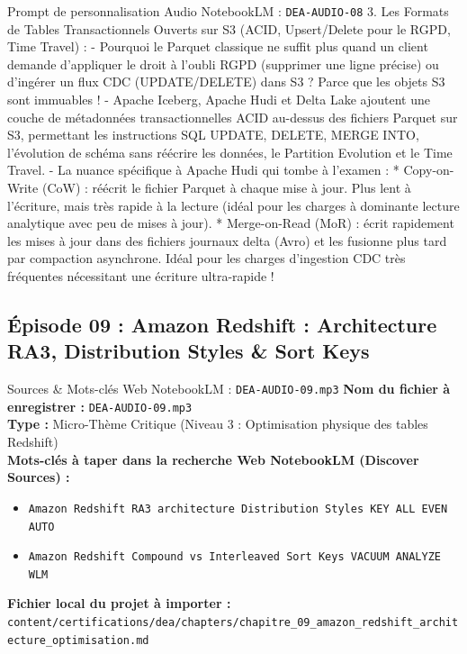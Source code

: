\documentclass[11pt,a4paper]{article}
\begin{document}
\begin{promptbox}{Prompt de personnalisation Audio NotebookLM : \texttt{DEA-AUDIO-08}}
3. Les Formats de Tables Transactionnels Ouverts sur S3 (ACID, Upsert/Delete pour le RGPD, Time Travel) :
- Pourquoi le Parquet classique ne suffit plus quand un client demande d'appliquer le droit à l'oubli RGPD (supprimer une ligne précise) ou d'ingérer un flux CDC (UPDATE/DELETE) dans S3 ? Parce que les objets S3 sont immuables !
- Apache Iceberg, Apache Hudi et Delta Lake ajoutent une couche de métadonnées transactionnelles ACID au-dessus des fichiers Parquet sur S3, permettant les instructions SQL UPDATE, DELETE, MERGE INTO, l'évolution de schéma sans réécrire les données, le Partition Evolution et le Time Travel.
- La nuance spécifique à Apache Hudi qui tombe à l'examen :
  * Copy-on-Write (CoW) : réécrit le fichier Parquet à chaque mise à jour. Plus lent à l'écriture, mais très rapide à la lecture (idéal pour les charges à dominante lecture analytique avec peu de mises à jour).
  * Merge-on-Read (MoR) : écrit rapidement les mises à jour dans des fichiers journaux delta (Avro) et les fusionne plus tard par compaction asynchrone. Idéal pour les charges d'ingestion CDC très fréquentes nécessitant une écriture ultra-rapide !
\end{promptbox}

\subsection{Épisode 09 : Amazon Redshift : Architecture RA3, Distribution Styles \& Sort Keys}
\begin{sourcebox}{Sources \& Mots-clés Web NotebookLM : \texttt{DEA-AUDIO-09.mp3}}
\textbf{Nom du fichier à enregistrer :} \texttt{DEA-AUDIO-09.mp3}\\
\textbf{Type :} Micro-Thème Critique (Niveau 3 : Optimisation physique des tables Redshift)\\
\textbf{Mots-clés à taper dans la recherche Web NotebookLM (Discover Sources) :}
\begin{itemize}[noitemsep]
    \item \texttt{Amazon Redshift RA3 architecture Distribution Styles KEY ALL EVEN AUTO}
    \item \texttt{Amazon Redshift Compound vs Interleaved Sort Keys VACUUM ANALYZE WLM}
\end{itemize}
\textbf{Fichier local du projet à importer :}
\texttt{content/certifications/dea/chapters/chapitre_09_amazon_redshift_architecture_optimisation.md}
\end{sourcebox}
\end{document}
